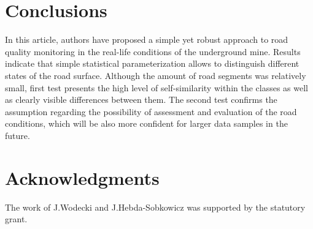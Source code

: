 \documentclass[10pt]{article}
\begin{document}
\section{Conclusions}
In this article, authors have proposed a simple yet robust approach to road quality monitoring in the real-life conditions of the underground mine. Results indicate that simple statistical parameterization allows to distinguish different states of the road surface. Although the amount of road segments was relatively small, first test presents the high level of self-similarity within the classes as well as clearly visible differences between them. The second test confirms the assumption regarding the possibility of assessment and evaluation of the road conditions, which will be also more confident for larger data samples in the future.
\section*{Acknowledgments}
The work of J.Wodecki and J.Hebda-Sobkowicz was supported by the statutory grant.


\end{document}
